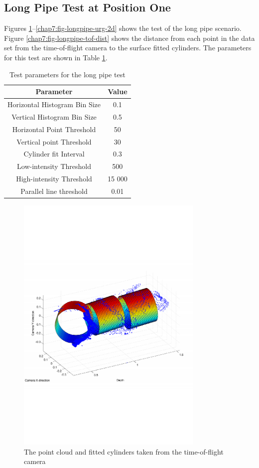 \subsection{Long Pipe Test at Position One}
Figures \ref{chap7:fig-longpipe-tof-3d}--\ref{chap7:fig-longpipe-urg-2d} shows the test of
the long pipe scenario. Figure \ref{chap7:fig-longpipe-tof-dist} shows the distance from each
point in the data set from the time-of-flight camera to the surface fitted cylinders. The
parameters for this test are shown in Table \ref{chap7:tab-longpipe}.
\begin{table}[htbp]
    \centering
    \begin{tabular}{|c|c|}
        \hline
        Parameter   &   Value   \\
        \hline
        Horizontal Histogram Bin Size & 0.1 \\
        Vertical Histogram Bin Size & 0.5 \\
        Horizontal Point Threshold & 50 \\
        Vertical point Threshold & 30 \\
        \hline
        Cylinder fit Interval & 0.3 \\
        Low-intensity Threshold & 500 \\
        High-intensity Threshold & 15 000 \\
        \hline
        Parallel line threshold & 0.01 \\
        \hline
    \end{tabular}
    \caption{Test parameters for the long pipe test}
    \label{chap7:tab-longpipe}
\end{table}
\begin{figure}[htbp]
    \centering
    \includegraphics[width=0.8\textwidth]{pics/longpipe-tof-3d}
    \caption{The point cloud and fitted cylinders taken from the time-of-flight camera}
    \label{chap7:fig-longpipe-tof-3d}
\end{figure}
